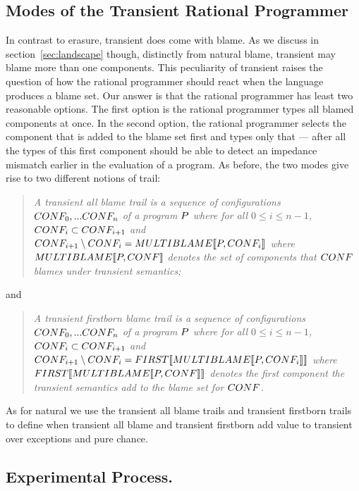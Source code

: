 \subsection{Modes of the Transient Rational Programmer} \label{sub:transient}

In contrast to erasure, transient does come with blame. As we discuss in
section~\ref{sec:landscape} though, distinctly from natural blame,
transient may blame more than one components. This peculiarity of 
transient raises the question of how the rational programmer should react
when the language produces a blame set. Our answer is that the rational
programmer has least two reasonable options.  The first option is the rational programmer types
all blamed components at once.  In the second option, the rational
programmer selects the component that is added to the blame set first and types
only that --- after all the types of this first component should be able
to  detect an impedance mismatch earlier in the evaluation of a program. 
As before, the two modes give rise to two different notions of trail:
\begin{quote}
\it 
A  transient all blame trail
is a sequence of configurations $CONF_0,...CONF_n$ of a program
$P$ where for all $0 \leq i \leq n - 1$, $CONF_i \subset CONF_{i+1}$ and
~$CONF_{i+1} \setminus CONF_i = MULTIBLAME\llbracket P, CONF_i\rrbracket$
where $MULTIBLAME\llbracket P, CONF\rrbracket$ denotes the set of components that $CONF$
blames under transient semantics; 
\end{quote}
\noindent
and
\begin{quote}
\it 
A transient firstborn blame trail
is a sequence of configurations $CONF_0,...CONF_n$ of a program
$P$ where for all $0 \leq i \leq n - 1$, $CONF_i \subset CONF_{i+1}$ and
  $CONF_{i+1} \setminus CONF_i = FIRST\llbracket MULTIBLAME\llbracket P, CONF_i\rrbracket\rrbracket$
  where $FIRST\llbracket MULTIBLAME\llbracket P, CONF\rrbracket\rrbracket$ denotes the first component 
  the transient semantics add to the blame set for $CONF$.
\end{quote}
\noindent As for natural we use the transient all blame trails and 
transient firstborn  trails to define when  transient all blame and 
transient firstborn add value to transient over exceptions and pure
chance. 

\subsection{Experimental Process.}

